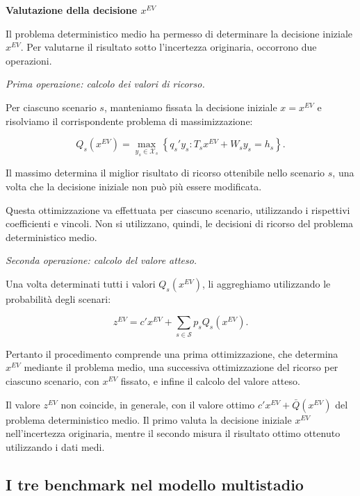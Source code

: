 \medskip

\noindent
\textbf{Valutazione della decisione $x^{EV}$}

Il problema deterministico medio ha permesso
di determinare la decisione iniziale $x^{EV}$.
Per valutarne il risultato sotto l'incertezza
originaria, occorrono due operazioni.

\textit{Prima operazione: calcolo dei valori di ricorso.}

Per ciascuno scenario $s$, manteniamo fissata
la decisione iniziale $x=x^{EV}$ e risolviamo
il corrispondente problema di massimizzazione:

\[
Q_s(x^{EV})
=
\max_{y_s\in\mathcal X_s}
\left\{
q_s'y_s:
T_sx^{EV}+W_sy_s=h_s
\right\}.
\]

Il massimo determina il miglior risultato
di ricorso ottenibile nello scenario $s$,
una volta che la decisione iniziale
non pu\`o pi\`u essere modificata.

Questa ottimizzazione va effettuata
per ciascuno scenario, utilizzando
i rispettivi coefficienti e vincoli.
Non si utilizzano, quindi, le decisioni
di ricorso del problema deterministico medio.

\textit{Seconda operazione: calcolo del valore atteso.}

Una volta determinati tutti i valori
$Q_s(x^{EV})$, li aggreghiamo utilizzando
le probabilit\`a degli scenari:

\begin{equation}
\boxed{
z^{EV}
=
c'x^{EV}
+
\sum_{s\in\mathcal S}p_sQ_s(x^{EV}).
}
\label{eq:cap15-ev-benchmark-v2}
\end{equation}

Pertanto il procedimento comprende
una prima ottimizzazione, che determina
$x^{EV}$ mediante il problema medio,
una successiva ottimizzazione del ricorso
per ciascuno scenario, con $x^{EV}$ fissato,
e infine il calcolo del valore atteso.


Il valore $z^{EV}$ non coincide, in generale,
con il valore ottimo
$c'x^{EV}+\bar Q(x^{EV})$
del problema deterministico medio.
Il primo valuta la decisione iniziale
$x^{EV}$ nell'incertezza originaria,
mentre il secondo misura il risultato
ottimo ottenuto utilizzando i dati medi.


\subsection{I tre benchmark nel modello multistadio}

